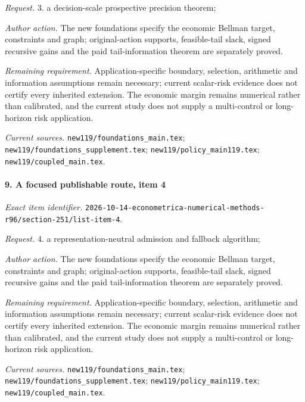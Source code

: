 \par\emph{Request.} 3. a decision-scale prospective precision theorem;

\par\emph{Author action.} The new foundations specify the economic Bellman target, constraints and graph; original-action supports, feasible-tail slack, signed recursive gains and the paid tail-information theorem are separately proved.

\par\emph{Remaining requirement.} Application-specific boundary, selection, arithmetic and information assumptions remain necessary; current scalar-risk evidence does not certify every inherited extension. The economic margin remains numerical rather than calibrated, and the current study does not supply a multi-control or long-horizon risk application.

\par\emph{Current sources.} \nolinkurl{new119/foundations_main.tex}; \nolinkurl{new119/foundations_supplement.tex}; \nolinkurl{new119/policy_main119.tex}; \nolinkurl{new119/coupled_main.tex}.

\paragraph{9. A focused publishable route, item 4}

\emph{Exact item identifier.} \nolinkurl{2026-10-14-econometrica-numerical-methods-r96/section-251/list-item-4}.

\par\emph{Request.} 4. a representation-neutral admission and fallback algorithm;

\par\emph{Author action.} The new foundations specify the economic Bellman target, constraints and graph; original-action supports, feasible-tail slack, signed recursive gains and the paid tail-information theorem are separately proved.

\par\emph{Remaining requirement.} Application-specific boundary, selection, arithmetic and information assumptions remain necessary; current scalar-risk evidence does not certify every inherited extension. The economic margin remains numerical rather than calibrated, and the current study does not supply a multi-control or long-horizon risk application.

\par\emph{Current sources.} \nolinkurl{new119/foundations_main.tex}; \nolinkurl{new119/foundations_supplement.tex}; \nolinkurl{new119/policy_main119.tex}; \nolinkurl{new119/coupled_main.tex}.


